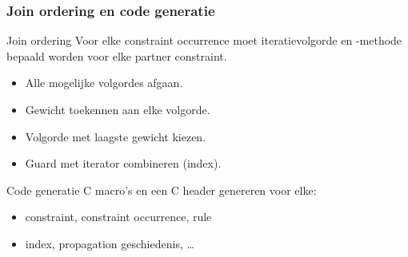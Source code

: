\documentclass{beamer}
\begin{document}
\begin{frame}
  \frametitle{Join ordering en code generatie}
  \begin{block}{Join ordering}
    Voor elke constraint occurrence moet iteratievolgorde en -methode bepaald worden
    voor elke partner constraint.
    \begin{itemize}
      \item Alle mogelijke volgordes afgaan.
      \item Gewicht toekennen aan elke volgorde.
      \item Volgorde met laagste gewicht kiezen.
      \item Guard met iterator combineren (index).
    \end{itemize}
  \end{block}
  \begin{block}{Code generatie}
    C macro's en een C header genereren voor elke:
    \begin{itemize}
      \item constraint, constraint occurrence, rule
      \item index, propagation geschiedenis, \ldots
    \end{itemize}
  \end{block}
\end{frame}
\end{document}
